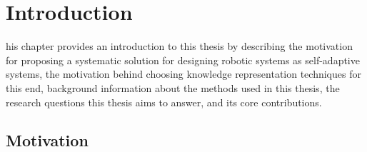 \chapter{Introduction}
\label{introduction}




\newpage

his chapter provides an introduction to this thesis by describing the motivation for proposing a systematic solution for designing robotic systems as self-adaptive systems, the motivation behind choosing knowledge representation techniques for this end, background information about the methods used in this thesis, the research questions this thesis aims to answer, and its core contributions.

\section{Motivation}\label{sec:intro:motivation}


